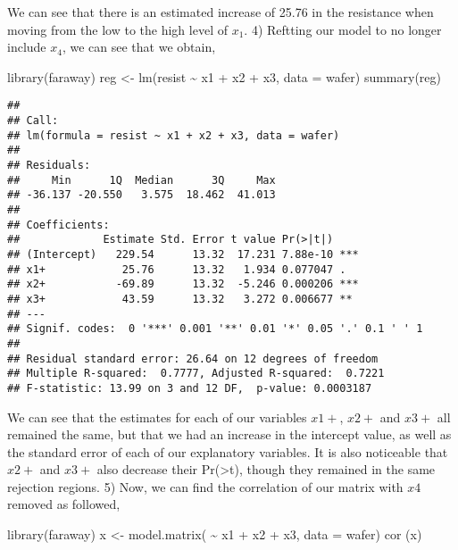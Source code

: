 \documentclass[
]{article}
\newenvironment{Shaded}{\begin{snugshade}}{\end{snugshade}}
\newcommand{\AttributeTok}[1]{\textcolor[rgb]{0.77,0.63,0.00}{#1}}
\newcommand{\FunctionTok}[1]{\textcolor[rgb]{0.00,0.00,0.00}{#1}}
\newcommand{\NormalTok}[1]{#1}
\newcommand{\OtherTok}[1]{\textcolor[rgb]{0.56,0.35,0.01}{#1}}
\newcommand{\SpecialCharTok}[1]{\textcolor[rgb]{0.00,0.00,0.00}{#1}}
\begin{document}
We can see that there is an estimated increase of 25.76 in the
resistance when moving from the low to the high level of \(x_1\). 4)
Reftting our model to no longer include \(x_4\), we can see that we
obtain,

\begin{Shaded}
\begin{Highlighting}[]
  \FunctionTok{library}\NormalTok{(faraway)}
\NormalTok{  reg }\OtherTok{\textless{}{-}} \FunctionTok{lm}\NormalTok{(resist }\SpecialCharTok{\textasciitilde{}}\NormalTok{ x1 }\SpecialCharTok{+}\NormalTok{ x2 }\SpecialCharTok{+}\NormalTok{ x3, }\AttributeTok{data =}\NormalTok{ wafer)}
  \FunctionTok{summary}\NormalTok{(reg)}
\end{Highlighting}
\end{Shaded}

\begin{verbatim}
## 
## Call:
## lm(formula = resist ~ x1 + x2 + x3, data = wafer)
## 
## Residuals:
##     Min      1Q  Median      3Q     Max 
## -36.137 -20.550   3.575  18.462  41.013 
## 
## Coefficients:
##             Estimate Std. Error t value Pr(>|t|)    
## (Intercept)   229.54      13.32  17.231 7.88e-10 ***
## x1+            25.76      13.32   1.934 0.077047 .  
## x2+           -69.89      13.32  -5.246 0.000206 ***
## x3+            43.59      13.32   3.272 0.006677 ** 
## ---
## Signif. codes:  0 '***' 0.001 '**' 0.01 '*' 0.05 '.' 0.1 ' ' 1
## 
## Residual standard error: 26.64 on 12 degrees of freedom
## Multiple R-squared:  0.7777, Adjusted R-squared:  0.7221 
## F-statistic: 13.99 on 3 and 12 DF,  p-value: 0.0003187
\end{verbatim}

We can see that the estimates for each of our variables \(x1+\), \(x2+\)
and \(x3+\) all remained the same, but that we had an increase in the
intercept value, as well as the standard error of each of our
explanatory variables. It is also noticeable that \(x2+\) and \(x3+\)
also decrease their Pr(\textgreater\textbar t\textbar), though they
remained in the same rejection regions. 5) Now, we can find the
correlation of our matrix with \(x4\) removed as followed,

\begin{Shaded}
\begin{Highlighting}[]
  \FunctionTok{library}\NormalTok{(faraway)}
\NormalTok{  x }\OtherTok{\textless{}{-}} \FunctionTok{model.matrix}\NormalTok{( }\SpecialCharTok{\textasciitilde{}}\NormalTok{ x1 }\SpecialCharTok{+}\NormalTok{ x2 }\SpecialCharTok{+}\NormalTok{ x3, }\AttributeTok{data =}\NormalTok{ wafer)}
  \FunctionTok{cor}\NormalTok{ (x)}
\end{Highlighting}
\end{Shaded}
\end{document}

